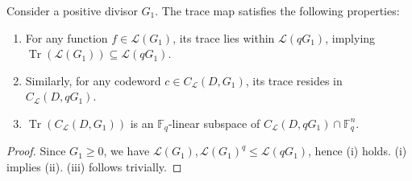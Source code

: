 \documentclass[entropy,article,submit,pdftex,moreauthors]{Definitions/mdpi}
\DeclareMathOperator{\trace}{Tr}
\begin{document}
\begin{Lemma} \label{lm:trace-code-props}
	Consider a positive divisor $G_1$. The trace map satisfies the following properties:
	\begin{enumerate}[label=(\roman*)]
		\item For any function $f \in \mathscr{L}(G_1)$, its trace lies within $\mathscr{L}(qG_1)$, implying $\trace(\mathscr{L}(G_1)) \subseteq \mathscr{L}(qG_1)$.
		\item Similarly, for any codeword $c \in C_{\mathcal{L}}(D,G_1)$, its trace resides in $C_{\mathcal{L}}(D,qG_1)$. 
		\item $\trace(C_{\mathcal{L}}(D,G_1))$ is an $\mathbb{F}_q$-linear subspace of $C_{\mathcal{L}}(D,qG_1) \cap \mathbb{F}_q^n$.
	\end{enumerate}
\end{Lemma}
\begin{proof}
Since $G_1\geq 0$, we have $\mathscr{L}(G_1), \mathscr{L}(G_1)^q \leq \mathscr{L}(qG_1)$, hence (i) holds. (i) implies (ii). (iii) follows trivially.
\end{proof}
\end{document}
